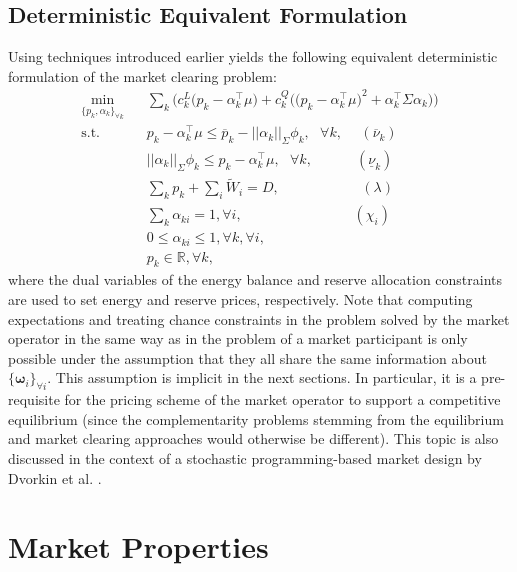 \documentclass{article}
\begin{document}
\subsection{Deterministic Equivalent Formulation}
Using techniques introduced earlier yields the following equivalent deterministic formulation of the market clearing problem:
\begin{align}
\underset{\{p_k, \alpha_k\}_{\forall k}}{\min} \hspace{10pt} & \sum_k \Big(c_k^L\big(p_k - \alpha_k^\top \mu\big) + c_k^Q \Big(\big(p_k - \alpha_{k}^\top \mu \big)^2 + \alpha_k^\top \Sigma \alpha_k\Big)\Big)\\
\mbox{s.t. } & p_k - \alpha_k^\top \mu\le \overline{p}_k - ||\alpha_k||_{\Sigma} \phi_k, \mbox{ }\forall k, \hspace{15pt}(\overline{\nu}_k)\\
& ||\alpha_k||_{\Sigma} \phi_k \le p_k - \alpha_k^\top \mu, \mbox{ }\forall k, \hspace{37pt}(\underline{\nu}_k)\\
& \sum_k p_k + \sum_i \tilde{W}_i = D, \hspace{70pt} (\lambda)\\
& \sum_k \alpha_{ki} = 1, \forall i, \hspace{95pt} (\chi_i)\\
& 0 \le \alpha_{ki} \le 1, \forall k, \forall i,\\
& p_k \in \mathbb{R}, \forall k,
\end{align}
where the dual variables of the energy balance and reserve allocation constraints are used to set energy and reserve prices, respectively. Note that computing expectations and treating chance constraints in the problem solved by the market operator in the same way as in the problem of a market participant is only possible under the assumption that they all share the same information about $\{\boldsymbol{\omega}_i\}_{\forall i}$. This assumption is implicit in the next sections. In particular, it is a pre-requisite for the pricing scheme of the market operator to support a competitive equilibrium (since the complementarity problems stemming from the equilibrium and market clearing approaches would otherwise be different). This topic is also discussed in the context of a stochastic programming-based market design by Dvorkin et al. \cite{DvorkinV2019}.

\section{Market Properties}
\end{document}
